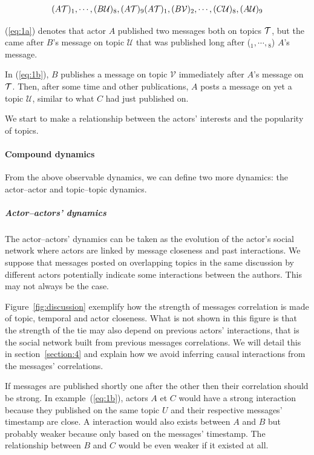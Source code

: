 \documentclass[a4paper,twoside]{article}
\newcommand{\V}{\mathcal{V}}
\newcommand{\U}{\mathcal{U}}
\begin{document}
\begin{subequations}
  \begin{align}
    \label{eq:1a}
    (A\T)_1, \cdots{}, (B\U)_8, (A\T)_9
  \end{align}
  \begin{align}
    \label{eq:1b}
    (A\T)_1, (B\V)_2, \cdots{},  (C\U)_8, (A\U)_9
  \end{align}
\end{subequations}

(\ref{eq:1a}) denotes that actor $A$ published two messages both on topics $\mathcal{T}$, but the  came after $B$'s message on topic $\U$ that was published long after (${}_1,\cdots, {}_8$) $A$'s  message.

In (\ref{eq:1b}), $B$ publishes a message on topic $\V$ immediately after $A$'s message on $\mathcal{T}$.  Then, after some time and other publications, $A$ posts a message on yet a  topic $\U$, similar to what $C$ had just published on.

We start to make a relationship between the actors' interests and the popularity of topics.

\paragraph{Compound dynamics}
From the above observable dynamics, we can define two more dynamics: the actor--actor and topic--topic dynamics.

\subparagraph{Actor--actors' dynamics}

The actor--actors' dynamics can be taken as the evolution of the actor's social network where actors are linked by message closeness and past interactions. We suppose that messages posted on overlapping topics in the same discussion by different actors potentially indicate some interactions between the authors.   This may not always be the case.

Figure~\ref{fig:discussion} exemplify how the strength of messages correlation is made of topic, temporal and actor closeness.  What is not shown in this figure is that the strength of the tie may also depend on previous actors' interactions, that is the social network built from previous messages correlations.
We will detail this in section~\ref{section:4} and explain how we avoid inferring causal interactions from the messages' correlations.

If messages are published shortly one after the other then their correlation should be strong.  In example~(\ref{eq:1b}), actors $A$ et $C$ would have a strong interaction because they published on the same topic $U$ and their respective messages' timestamp are close.  A interaction would also exists between $A$ and $B$ but probably weaker because only based on the messages' timestamp.  The relationship between $B$ and $C$ would be even weaker if it existed at all.
\end{document}
